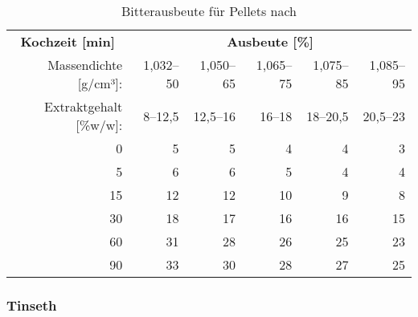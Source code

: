 \documentclass[a4paper,parskip=half]{scrartcl}
\begin{document}
\begin{table}[H]
\centering
\begin{tabular}{rrrrrr} 
\toprule
\multicolumn{1}{c}{\textbf{Kochzeit [min]}} & \multicolumn{5}{c}{\textbf{Ausbeute [\%]}}                                 \\
Massendichte [g/cm³]:                    & 1,032–50 & 1,050–65 & 1,065–75 & 1,075–85 & 1,085–95  \\
Extraktgehalt [\%w/w]:                    & 8–12,5 & 12,5–16 & 16–18 & 18–20,5 & 20,5–23  \\
\midrule
0                                            & 5        & 5        & 4                            & 4                            & 3                             \\
5                                            & 6        & 6        & 5                            & 4                            & 4                             \\
15                                           & 12       & 12       & 10                           & 9                            & 8                             \\
30                                           & 18       & 17       & 16                           & 16                           & 15                            \\
60                                           & 31       & 28       & 26                           & 25                           & 23                            \\
90                                           & 33       & 30       & 28                           & 27                           & 25                     \\
\bottomrule
\end{tabular}
\caption{Bitterausbeute für Pellets nach \citeauthor{Noonan1996} \parencite[215]{Noonan1996}}
\label{table:noonanutilpellets}
\end{table}

\subsubsection*{Tinseth}
\end{document}
